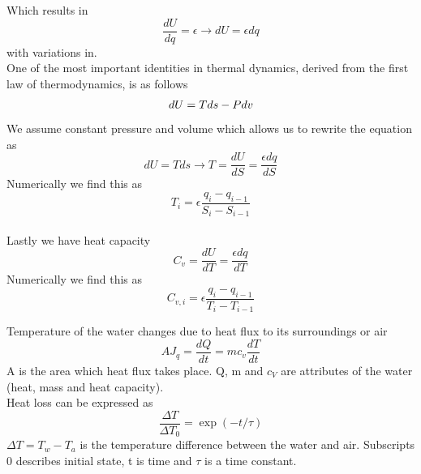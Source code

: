 \documentclass[reprint,english,notitlepage]{revtex4-2}
\begin{document}
Which results in
\begin{equation}
  \frac{dU}{dq} = \epsilon \rightarrow dU = \epsilon dq
\end{equation}
with variations in.\\

One of the most important identities in thermal dynamics, derived from the first law of thermodynamics, is as follows
\begin{equation}
dU = Tds - Pdv \\
\end{equation}
We assume constant pressure and volume which allows us to rewrite the equation as
\begin{equation}
  dU = Tds \rightarrow T = \frac{dU}{dS} = \frac{\epsilon dq}{dS}
\end{equation}
Numerically we find this as
\begin{equation}
  T_i = \epsilon\frac{q_i - q_{i -1}}{S_i - S_{i -1}}
\end{equation}
\\
Lastly we have heat capacity
\begin{equation}
C_v = \frac{dU}{dT} = \frac{\epsilon dq}{dT}
\end{equation}
Numerically we find this as
\begin{equation}
  C_{v, i} = \epsilon\frac{q_i - q_{i -1}}{T_i - T_{i -1}}
\end{equation}

Temperature of the water changes due to heat flux to its surroundings or air
\begin{equation}
  AJ_q = \frac{dQ}{dt} = mc_v\frac{dT}{dt}
  \label{eq: heatflux}
\end{equation}
A is the area which heat flux takes place. Q, m and $c_V$ are attributes of the water (heat, mass and heat capacity).\\
Heat loss can be expressed as
\begin{equation}
  \frac{\Delta{T}}{\Delta{T_0}} = \exp(-t/\tau)
  \label{eq: heatloss}
\end{equation}
$\Delta{T} = T_w - T_a$ is the temperature difference between the water and air. Subscripts 0 describes initial state, t is time and $\tau$ is a time constant.
\end{document}
